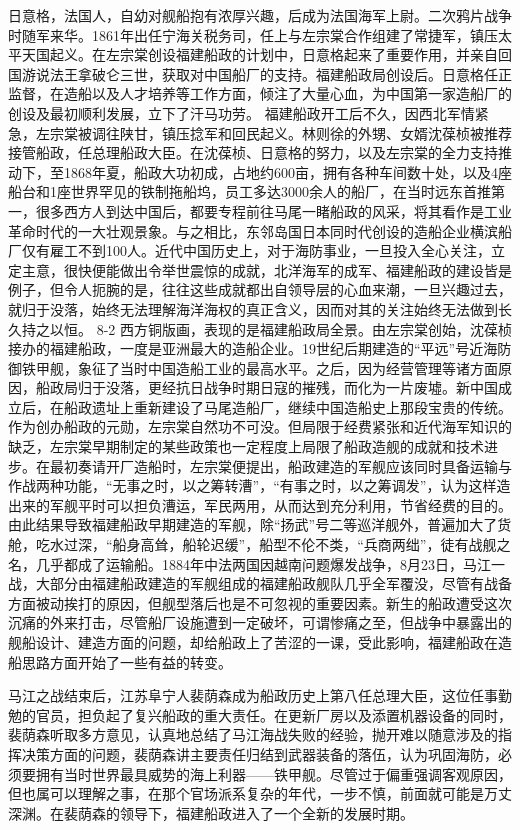 \documentclass[12pt,UTF8]{ctexbook}
\begin{document}
日意格，法国人，自幼对舰船抱有浓厚兴趣，后成为法国海军上尉。二次鸦片战争时随军来华。1861年出任宁海关税务司，任上与左宗棠合作组建了常捷军，镇压太平天国起义。在左宗棠创设福建船政的计划中，日意格起来了重要作用，并亲自回国游说法王拿破仑三世，获取对中国船厂的支持。福建船政局创设后。日意格任正监督，在造船以及人才培养等工作方面，倾注了大量心血，为中国第一家造船厂的创设及最初顺利发展，立下了汗马功劳。
福建船政开工后不久，因西北军情紧急，左宗棠被调往陕甘，镇压捻军和回民起义。林则徐的外甥、女婿沈葆桢被推荐接管船政，任总理船政大臣。在沈葆桢、日意格的努力，以及左宗棠的全力支持推动下，至1868年夏，船政大功初成，占地约600亩，拥有各种车间数十处，以及4座船台和1座世界罕见的铁制拖船坞，员工多达3000余人的船厂，在当时远东首推第一，很多西方人到达中国后，都要专程前往马尾一睹船政的风采，将其看作是工业革命时代的一大壮观景象。与之相比，东邻岛国日本同时代创设的造船企业横滨船厂仅有雇工不到100人。近代中国历史上，对于海防事业，一旦投入全心关注，立定主意，很快便能做出令举世震惊的成就，北洋海军的成军、福建船政的建设皆是例子，但令人扼腕的是，往往这些成就都出自领导层的心血来潮，一旦兴趣过去，就归于没落，始终无法理解海洋海权的真正含义，因而对其的关注始终无法做到长久持之以恒。
8-2
西方铜版画，表现的是福建船政局全景。由左宗棠创始，沈葆桢接办的福建船政，一度是亚洲最大的造船企业。19世纪后期建造的“平远”号近海防御铁甲舰，象征了当时中国造船工业的最高水平。之后，因为经营管理等诸方面原因，船政局归于没落，更经抗日战争时期日寇的摧残，而化为一片废墟。新中国成立后，在船政遗址上重新建设了马尾造船厂，继续中国造船史上那段宝贵的传统。
作为创办船政的元勋，左宗棠自然功不可没。但局限于经费紧张和近代海军知识的缺乏，左宗棠早期制定的某些政策也一定程度上局限了船政造舰的成就和技术进步。在最初奏请开厂造船时，左宗棠便提出，船政建造的军舰应该同时具备运输与作战两种功能，“无事之时，以之筹转漕”，“有事之时，以之筹调发”，认为这样造出来的军舰平时可以担负漕运，军民两用，从而达到充分利用，节省经费的目的。由此结果导致福建船政早期建造的军舰，除“扬武”号二等巡洋舰外，普遍加大了货舱，吃水过深，“船身高耸，船轮迟缓”，船型不伦不类，“兵商两绌”，徒有战舰之名，几乎都成了运输船。1884年中法两国因越南问题爆发战争，8月23日，马江一战，大部分由福建船政建造的军舰组成的福建船政舰队几乎全军覆没，尽管有战备方面被动挨打的原因，但舰型落后也是不可忽视的重要因素。新生的船政遭受这次沉痛的外来打击，尽管船厂设施遭到一定破坏，可谓惨痛之至，但战争中暴露出的舰船设计、建造方面的问题，却给船政上了苦涩的一课，受此影响，福建船政在造船思路方面开始了一些有益的转变。


马江之战结束后，江苏阜宁人裴荫森成为船政历史上第八任总理大臣，这位任事勤勉的官员，担负起了复兴船政的重大责任。在更新厂房以及添置机器设备的同时，裴荫森听取多方意见，认真地总结了马江海战失败的经验，抛开难以随意涉及的指挥决策方面的问题，裴荫森讲主要责任归结到武器装备的落伍，认为巩固海防，必须要拥有当时世界最具威势的海上利器——铁甲舰。尽管过于偏重强调客观原因，但也属可以理解之事，在那个官场派系复杂的年代，一步不慎，前面就可能是万丈深渊。在裴荫森的领导下，福建船政进入了一个全新的发展时期。
\end{document}
